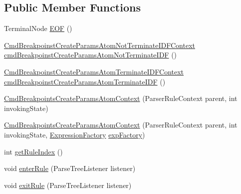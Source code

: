 \subsection*{Public Member Functions}
\begin{DoxyCompactItemize}
\item 
Terminal\+Node \hyperlink{classgov_1_1nasa_1_1jpf_1_1inspector_1_1server_1_1expression_1_1parser_1_1_expression_grammar_paa3acc222754f42ff002c5d98d8d38136_ae27c74ed6069d7ac4bfeebfe198a31c7}{E\+OF} ()
\item 
\hyperlink{classgov_1_1nasa_1_1jpf_1_1inspector_1_1server_1_1expression_1_1parser_1_1_expression_grammar_paee196826319d0ea00470866a7ffd8d7b}{Cmd\+Breakpoinst\+Create\+Params\+Atom\+Not\+Terminate\+I\+D\+F\+Context} \hyperlink{classgov_1_1nasa_1_1jpf_1_1inspector_1_1server_1_1expression_1_1parser_1_1_expression_grammar_paa3acc222754f42ff002c5d98d8d38136_a19997a1e568eec0709bdea05180106e7}{cmd\+Breakpoinst\+Create\+Params\+Atom\+Not\+Terminate\+I\+DF} ()
\item 
\hyperlink{classgov_1_1nasa_1_1jpf_1_1inspector_1_1server_1_1expression_1_1parser_1_1_expression_grammar_pa33db42909734e187834b73b54c5beb59}{Cmd\+Breakpoinst\+Create\+Params\+Atom\+Terminate\+I\+D\+F\+Context} \hyperlink{classgov_1_1nasa_1_1jpf_1_1inspector_1_1server_1_1expression_1_1parser_1_1_expression_grammar_paa3acc222754f42ff002c5d98d8d38136_a843856bc217ecb08720ce3376bc1dc92}{cmd\+Breakpoinst\+Create\+Params\+Atom\+Terminate\+I\+DF} ()
\item 
\hyperlink{classgov_1_1nasa_1_1jpf_1_1inspector_1_1server_1_1expression_1_1parser_1_1_expression_grammar_paa3acc222754f42ff002c5d98d8d38136_a2c1b51bd4fa239268e0b97567d4af63c}{Cmd\+Breakpoints\+Create\+Params\+Atom\+Context} (Parser\+Rule\+Context parent, int invoking\+State)
\item 
\hyperlink{classgov_1_1nasa_1_1jpf_1_1inspector_1_1server_1_1expression_1_1parser_1_1_expression_grammar_paa3acc222754f42ff002c5d98d8d38136_a05533c03c2a5439ae06538ec7086092b}{Cmd\+Breakpoints\+Create\+Params\+Atom\+Context} (Parser\+Rule\+Context parent, int invoking\+State, \hyperlink{classgov_1_1nasa_1_1jpf_1_1inspector_1_1server_1_1expression_1_1_expression_factory}{Expression\+Factory} \hyperlink{classgov_1_1nasa_1_1jpf_1_1inspector_1_1server_1_1expression_1_1parser_1_1_expression_grammar_paa3acc222754f42ff002c5d98d8d38136_adb23e6d9ce49bb3c885710e9b54f5bb8}{exp\+Factory})
\item 
int \hyperlink{classgov_1_1nasa_1_1jpf_1_1inspector_1_1server_1_1expression_1_1parser_1_1_expression_grammar_paa3acc222754f42ff002c5d98d8d38136_a26d6cb3c5a53b2e4f723f439d3ca340e}{get\+Rule\+Index} ()
\item 
void \hyperlink{classgov_1_1nasa_1_1jpf_1_1inspector_1_1server_1_1expression_1_1parser_1_1_expression_grammar_paa3acc222754f42ff002c5d98d8d38136_ac2619a5c9c4307d254c43d698f2883d3}{enter\+Rule} (Parse\+Tree\+Listener listener)
\item 
void \hyperlink{classgov_1_1nasa_1_1jpf_1_1inspector_1_1server_1_1expression_1_1parser_1_1_expression_grammar_paa3acc222754f42ff002c5d98d8d38136_a0041bd61173dac6aebfe4d1e7466e448}{exit\+Rule} (Parse\+Tree\+Listener listener)
\end{DoxyCompactItemize}
